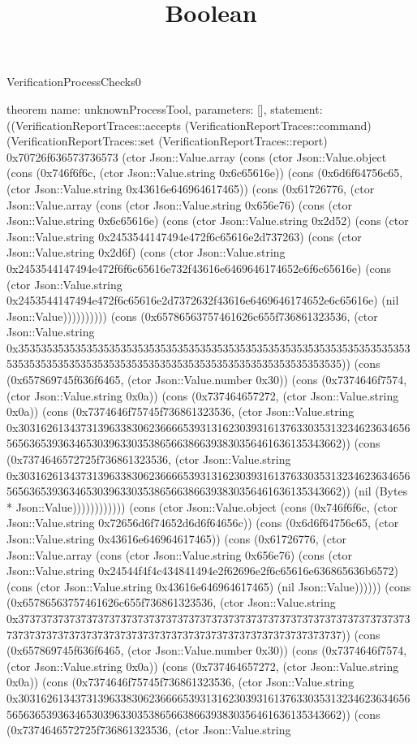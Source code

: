 \begin{lexlean}{VerificationProcessChecks0}
\title{Boolean}
\begin{semanticmodule}
theorem{
  name: unknownProcessTool,
  parameters: [],
  statement: ((VerificationReportTraces::accepts (VerificationReportTraces::command) (VerificationReportTraces::set (VerificationReportTraces::report) 0x70726f636573736573 (ctor Json::Value.array (cons (ctor Json::Value.object (cons (0x746f6f6c, (ctor Json::Value.string 0x6c65616e)) (cons (0x6d6f64756c65, (ctor Json::Value.string 0x43616e646964617465)) (cons (0x61726776, (ctor Json::Value.array (cons (ctor Json::Value.string 0x656e76) (cons (ctor Json::Value.string 0x6c65616e) (cons (ctor Json::Value.string 0x2d52) (cons (ctor Json::Value.string 0x2453544147494e472f6c65616e2d737263) (cons (ctor Json::Value.string 0x2d6f) (cons (ctor Json::Value.string 0x2453544147494e472f6f6c65616e732f43616e6469646174652e6f6c65616e) (cons (ctor Json::Value.string 0x2453544147494e472f6c65616e2d7372632f43616e6469646174652e6c65616e) (nil Json::Value)))))))))) (cons (0x65786563757461626c655f736861323536, (ctor Json::Value.string 0x35353535353535353535353535353535353535353535353535353535353535353535353535353535353535353535353535353535353535353535353535353535)) (cons (0x657869745f636f6465, (ctor Json::Value.number 0x30)) (cons (0x7374646f7574, (ctor Json::Value.string 0x0a)) (cons (0x737464657272, (ctor Json::Value.string 0x0a)) (cons (0x7374646f75745f736861323536, (ctor Json::Value.string 0x30316261343731396338306236666539313162303931613763303531323462363465656563653936346530396330353865663866393830356461636135343662)) (cons (0x7374646572725f736861323536, (ctor Json::Value.string 0x30316261343731396338306236666539313162303931613763303531323462363465656563653936346530396330353865663866393830356461636135343662)) (nil (Bytes * Json::Value)))))))))))) (cons (ctor Json::Value.object (cons (0x746f6f6c, (ctor Json::Value.string 0x72656d6f74652d6d6f64656c)) (cons (0x6d6f64756c65, (ctor Json::Value.string 0x43616e646964617465)) (cons (0x61726776, (ctor Json::Value.array (cons (ctor Json::Value.string 0x656e76) (cons (ctor Json::Value.string 0x24544f4f4c434841494e2f62696e2f6c65616e636865636b6572) (cons (ctor Json::Value.string 0x43616e646964617465) (nil Json::Value)))))) (cons (0x65786563757461626c655f736861323536, (ctor Json::Value.string 0x37373737373737373737373737373737373737373737373737373737373737373737373737373737373737373737373737373737373737373737373737373737)) (cons (0x657869745f636f6465, (ctor Json::Value.number 0x30)) (cons (0x7374646f7574, (ctor Json::Value.string 0x0a)) (cons (0x737464657272, (ctor Json::Value.string 0x0a)) (cons (0x7374646f75745f736861323536, (ctor Json::Value.string 0x30316261343731396338306236666539313162303931613763303531323462363465656563653936346530396330353865663866393830356461636135343662)) (cons (0x7374646572725f736861323536, (ctor Json::Value.string }
\end{semanticmodule}
\end{lexlean}
